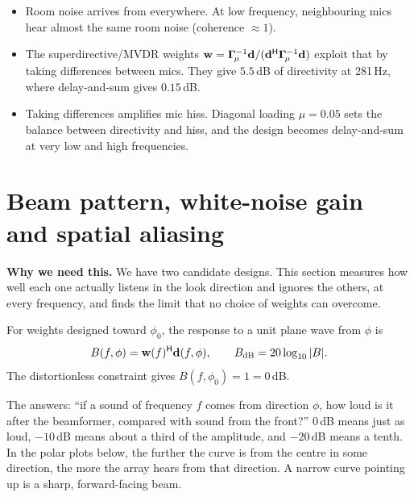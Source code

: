 \documentclass[11pt]{article}
\begin{document}
\begin{takeaways}
\begin{itemize}[nosep]
\item Room noise arrives from everywhere. At low frequency, neighbouring mics hear almost the same
  room noise (coherence $\approx1$).
\item The superdirective/MVDR weights $\mathbf{w}=\bm{\Gamma}_{\!\mu}^{-1}\mathbf{d}/(\mathbf{d}^{\mathsf H}\bm{\Gamma}_{\!\mu}^{-1}\mathbf{d})$ exploit that by
  taking differences between mics. They give $5.5$\,dB of directivity at 281\,Hz, where
  delay-and-sum gives $0.15$\,dB.
\item Taking differences amplifies mic hiss. Diagonal loading $\mu=0.05$ sets the balance between
  directivity and hiss, and the design becomes delay-and-sum at very low and high frequencies.
\end{itemize}
\end{takeaways}

\section{Beam pattern, white-noise gain and spatial aliasing}\label{sec:pattern}

\noindent\textbf{Why we need this.} We have two candidate designs. This section measures how
well each one actually listens in the look direction and ignores the others, at every frequency,
and finds the limit that no choice of weights can overcome.

\begin{definition}
For weights designed toward $\phi_0$, the response to a unit plane wave from $\phi$ is
\begin{equation}
  B(f,\phi)=\mathbf{w}(f)^{\mathsf H}\mathbf{d}(f,\phi),\qquad B_{\mathrm{dB}}=20\log_{10}|B|.
\end{equation}
The distortionless constraint gives $B(f,\phi_0)=1=0$\,dB.
\end{definition}

\begin{inplainwords}
The  answers: ``if a sound of frequency $f$ comes from direction
$\phi$, how loud is it after the beamformer, compared with sound from the front?'' $0$\,dB means
just as loud, $-10$\,dB means about a third of the amplitude, and $-20$\,dB means a tenth. In the polar
plots below, the further the curve is from the centre in some direction, the more the array
hears from that direction. A narrow curve pointing up is a sharp, forward-facing beam.
\end{inplainwords}
\end{document}

